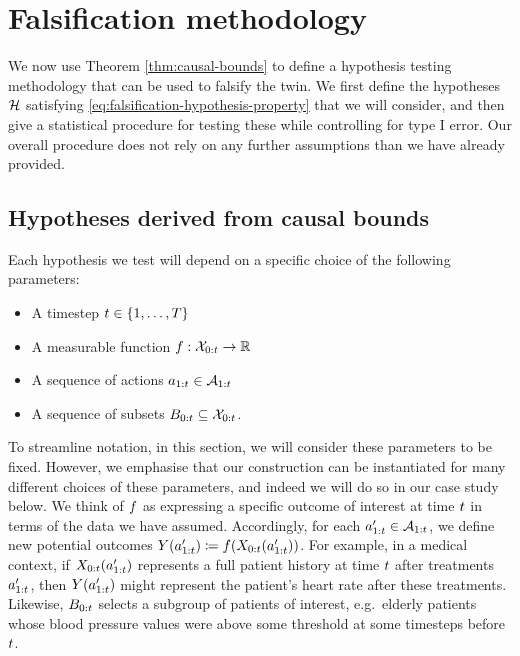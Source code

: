 %
%
%
%
%
%


\section{Falsification methodology} \label{sec:hypotheses-from-causal-bounds}

%

We now use Theorem \ref{thm:causal-bounds} to define a hypothesis testing methodology that can be used to falsify the twin.
We first define the hypotheses $\mathcal{H}$ satisfying \eqref{eq:falsification-hypothesis-property} that we will consider, and then give a statistical procedure for testing these while controlling for type I error.
Our overall procedure does not rely on any further assumptions than we have already provided.

%

%


%

\subsection{Hypotheses derived from causal bounds}

Each hypothesis we test will depend on a specific choice of the following parameters:

\begin{multicols}{2}
    \begin{itemize}
        \item A timestep $t \in \{1, \ldots, T\}$
        \item A measurable function $f : \mathcal{X}_{0:t} \to \mathbb{R}$
    \end{itemize}
    \columnbreak
    \begin{itemize}
        \item A sequence of actions $a_{1:t} \in \mathcal{A}_{1:t}$
        \item A sequence of subsets $B_{0:t} \subseteq \mathcal{X}_{0:t}$. 
    \end{itemize}
\end{multicols}

%
%
%
\noindent
To streamline notation, in this section, we will consider these parameters to be fixed.
However, we emphasise that our construction can be instantiated for many different choices of these parameters, and indeed we will do so in our case study below.
We think of $f$ as expressing a specific outcome of interest at time $t$ in terms of the data we have assumed.
Accordingly, for each $a_{1:t}' \in \mathcal{A}_{1:t}$, we define new potential outcomes
$Y(a_{1:t}') \coloneqq f(X_{0:t}(a_{1:t}'))$.
%
%
%
For example, in a medical context, if $X_{0:t}(a_{1:t}')$ represents a full patient history at time $t$ after treatments $a_{1:t}'$, then $Y(a_{1:t}')$ might represent the patient's heart rate after these treatments. 
Likewise, $B_{0:t}$ selects a subgroup of patients of interest, e.g.\ elderly patients whose blood pressure values were above some threshold at some timesteps before $t$.

